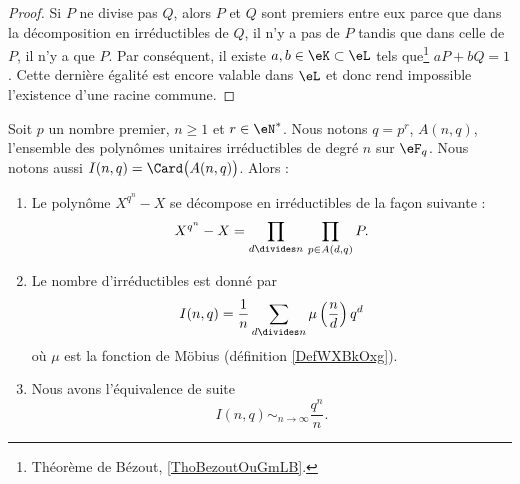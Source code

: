 \begin{proof}
    Si \( P\) ne divise pas \( Q\), alors \( P\) et \( Q\) sont premiers entre eux parce que dans la décomposition en irréductibles de \( Q\), il n'y a pas de \( P\) tandis que dans celle de \( P\), il n'y a que \( P\). Par conséquent, il existe \( a,b\in \eK\subset\eL\) tels que\footnote{Théorème de Bézout, \ref{ThoBezoutOuGmLB}.} \( aP+bQ=1\). Cette dernière égalité est encore valable dans \( \eL\) et donc rend impossible l'existence d'une racine commune.
\end{proof}

\begin{proposition} \label{PropVFNOvzZ}
    Soit \( p\) un nombre premier, \( n\geq 1\) et \( r\in \eN^*\). Nous notons \( q=p^r\), \( A(n,q)\), l'ensemble des polynômes unitaires irréductibles de degré \( n\) sur \( \eF_q\). Nous notons aussi \( I(n,q)=\Card\big( A(n,q) \big)\). Alors :
    \begin{enumerate}
        \item
            Le polynôme \( X^{q^n}-X\) se décompose en irréductibles de la façon suivante :
            \begin{equation}
                X^{q^n}-X=\prod_{d\divides n}\,\prod_{p\in A(d,q)}P.
            \end{equation}
        \item
            Le nombre d'irréductibles est donné par
            \begin{equation}
                I(n,q)=\frac{1}{ n }\sum_{d\divides n}\mu\left( \frac{ n }{ d } \right)q^d
            \end{equation}
            où \( \mu\) est la fonction de Möbius (définition \ref{DefWXBkOxg}).
        \item
            Nous avons l'équivalence de suite
            \begin{equation}
                I(n,q)\sim_{n\to\infty}\frac{ q^n }{ n }.
            \end{equation}
    \end{enumerate}
\end{proposition}

